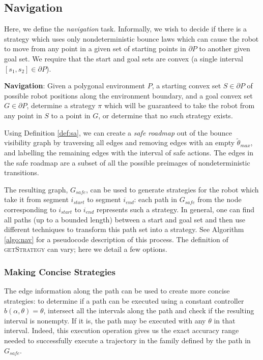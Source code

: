 \documentclass[]{styles/svproc}  %
\begin{document}
\subsection{Navigation}

Here, we define the \emph{navigation} task. Informally, we wish to decide if
there is a strategy which uses only nondeterministic bounce laws which can cause
the robot to move from any point in a given set of starting points in $\partial P$ to
another given goal set. We require that the start and goal sets are
convex (a single interval $[s_1, s_2] \in \partial P$).

\begin{definition}
\textbf{Navigation}:
Given a polygonal environment $P$, a starting convex set $S \in \partial P$ of possible robot positions along the
environment boundary, and a goal convex set $G \in \partial P$, determine a strategy $\pi$ which
will be guaranteed to take the robot from any point in $S$ to a point in $G$, or
determine that no such strategy exists.
\end{definition}

Using Definition \ref{def:sa}, we can create a \emph{safe roadmap} out of the 
bounce visibility graph by traversing all edges and removing edges with an 
empty $\tilde{\theta}_{max}$, and labelling the remaining edges with the interval 
of safe actions. The edges in the safe roadmap are a subset of all the possible
preimages of nondeterministic transitions.

The resulting graph, $G_{safe}$, can be used to generate strategies for the
robot which take it from segment $i_{start}$ to segment $i_{end}$: each path in
$G_{safe}$ from the node corresponding to $i_{start}$ to $i_{end}$ represents
such a strategy. In general, one can find all paths (up to a bounded length)
between a start and goal set and then use different techniques to transform this
path set into a strategy. See Algorithm \ref{algo:nav} for a pseudocode
description of this process. The definition of \textsc{getStrategy} can vary;
here we detail a few options.

\subsubsection{Making Concise Strategies}

The edge
information along the path can be used to create more concise strategies: to
determine if a path can be executed using a constant controller $b(\alpha,
\theta) = \theta$, intersect all the intervals along the path and check if the
resulting interval is nonempty. If it is, the path may be executed with any
$\theta$ in that interval. Indeed, this execution operation gives us the exact
accuracy range needed to successfully execute a trajectory in the family defined
by the path in $G_{safe}$.
\end{document}
